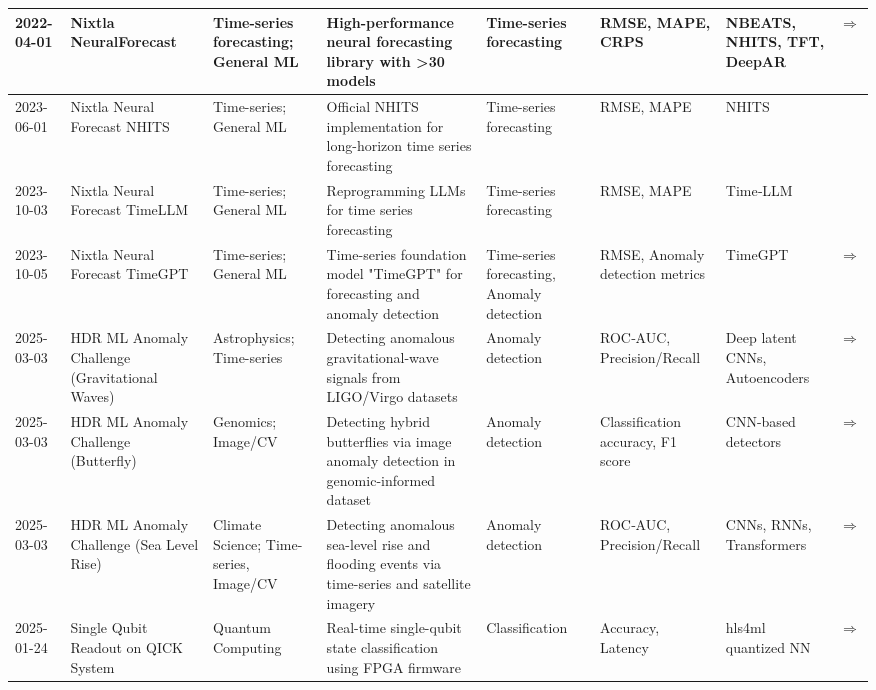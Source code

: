 \documentclass{article}
\begin{document}
\begin{landscape}
{\begin{longtable}{|p{1.5cm}|p{2.5cm}|p{2cm}|p{2cm}|p{3cm}|p{2cm}|p{2cm}|p{1cm}|}
2022-04-01 & Nixtla NeuralForecast & Time-series forecasting; General ML & High-performance neural forecasting library with >30 models & Time-series forecasting & RMSE, MAPE, CRPS & NBEATS, NHITS, TFT, DeepAR & \cite{olivares2022library_neuralforecast} \href{https://github.com/Nixtla/neuralforecast}{$\Rightarrow$ } \\ \hline
2023-06-01 & Nixtla Neural Forecast NHITS & Time-series; General ML & Official NHITS implementation for long-horizon time series forecasting & Time-series forecasting & RMSE, MAPE & NHITS & \cite{challu2023nhits} \\ \hline
2023-10-03 & Nixtla Neural Forecast TimeLLM & Time-series; General ML & Reprogramming LLMs for time series forecasting & Time-series forecasting & RMSE, MAPE & Time‑LLM & \cite{jin2023time} \\ \hline
2023-10-05 & Nixtla Neural Forecast TimeGPT & Time-series; General ML & Time-series foundation model "TimeGPT" for forecasting and anomaly detection & Time-series forecasting, Anomaly detection & RMSE, Anomaly detection metrics & TimeGPT & \cite{garza2023timegpt} \href{https://arxiv.org/abs/2310.03589}{$\Rightarrow$ } \\ \hline
2025-03-03 & HDR ML Anomaly Challenge (Gravitational Waves) & Astrophysics; Time-series & Detecting anomalous gravitational-wave signals from LIGO/Virgo datasets & Anomaly detection & ROC‑AUC, Precision/Recall & Deep latent CNNs, Autoencoders & \cite{campolongo2025hdranomaly2} \href{https://arxiv.org/abs/2503.02112}{$\Rightarrow$ } \\ \hline
2025-03-03 & HDR ML Anomaly Challenge (Butterfly) & Genomics; Image/CV & Detecting hybrid butterflies via image anomaly detection in genomic-informed dataset & Anomaly detection & Classification accuracy, F1 score & CNN-based detectors & \cite{campolongo2025hdranomaly} \href{https://arxiv.org/abs/2503.02112}{$\Rightarrow$ } \\ \hline
2025-03-03 & HDR ML Anomaly Challenge (Sea Level Rise) & Climate Science; Time-series, Image/CV & Detecting anomalous sea-level rise and flooding events via time-series and satellite imagery & Anomaly detection & ROC‑AUC, Precision/Recall & CNNs, RNNs, Transformers & \cite{campolongo2025hdranomaly3} \href{https://arxiv.org/abs/2503.02112}{$\Rightarrow$ } \\ \hline
2025-01-24 & Single Qubit Readout on QICK System & Quantum Computing & Real-time single-qubit state classification using FPGA firmware & Classification & Accuracy, Latency & hls4ml quantized NN & \cite{diguglielmo2025endtoend} \href{https://arxiv.org/abs/2501.14663}{$\Rightarrow$ } \\ \hline

\end{longtable}}
\end{landscape}
\end{document}
